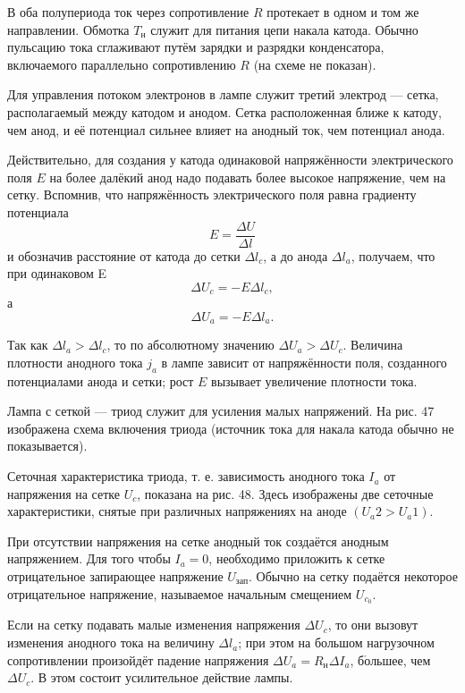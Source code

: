\documentclass[a4paper,10pt]{book}
\begin{document}
В оба полупериода ток через сопротивление $R$ протекает в одном и том же направлении. Обмотка $T_\text{н}$ служит для питания цепи накала катода. Обычно пульсацию тока сглаживают путём зарядки и разрядки конденсатора, включаемого параллельно сопротивлению $R$ (на схеме не показан).

Для управления потоком электронов в лампе служит третий электрод — сетка, располагаемый между катодом и анодом. Сетка расположенная ближе к катоду, чем анод, и её потенциал сильнее влияет на анодный ток, чем потенциал анода.

Действительно, для создания у катода одинаковой напряжённости электрического поля $E$ на более далёкий анод надо подавать более высокое напряжение, чем на сетку. Вспомнив, что напряжённость электрического поля равна градиенту потенциала\begin{equation}
E = \frac{\Delta U}{\Delta l}\nonumber
\end{equation} и обозначив расстояние от катода до сетки $\Delta l_c$, а до анода $\Delta l_a$, получаем, что при одинаковом E\begin{equation}
\Delta U_c = -E\Delta l_c,\nonumber
\end{equation} а \begin{equation}
\Delta U_a = -E\Delta l_a.\nonumber
\end{equation}

Так как $\Delta l_a>\Delta l_c$, то по абсолютному значению $\Delta U_a>\Delta U_c$. Величина плотности анодного тока $j_a$ в лампе зависит от напряжённости поля, созданного потенциалами анода и сетки; рост $E$ вызывает увеличение плотности тока.

Лампа с сеткой — триод служит для усиления малых напряжений. На рис. 47 изображена схема включения триода (источник тока для накала катода обычно не показывается).

Сеточная характеристика триода, т. е. зависимость анодного тока $I_a$ от напряжения на сетке $U_c$, показана на рис. 48. Здесь изображены две сеточные характеристики, снятые при различных напряжениях на аноде $(U_a2>U_a1)$.

При отсутствии напряжения на сетке анодный ток создаётся анодным напряжением. Для того чтобы $I_a=0$, необходимо приложить к сетке отрицательное запирающее напряжение $U_\text{зап}$. Обычно на сетку подаётся некоторое отрицательное напряжение, называемое начальным смещением $U_{c_0}$.

Если на сетку подавать малые изменения напряжения $\Delta U_c$, то они вызовут изменения анодного тока на величину $\Delta l_a$; при этом на большом нагрузочном сопротивлении произойдёт падение напряжения $\Delta U_a=R_\text{н} \Delta I_a$, б$\acute{\text{о}}$льшее, чем $\Delta U_c$. В этом состоит усилительное действие лампы.
\end{document}
